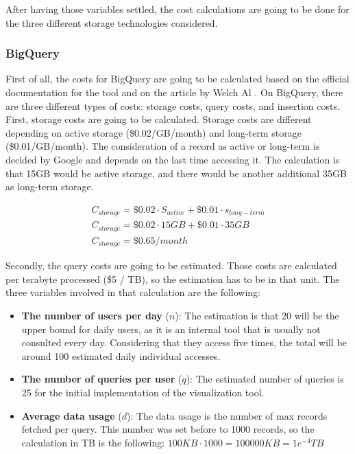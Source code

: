 \documentclass[english, 12pt, a4paper, sci, utf8, a-1b, online]{aaltothesis}
\begin{document}
After having those variables settled, the cost calculations are going to be done for the three different storage technologies considered.

\subsubsection*{BigQuery}

First of all, the costs for BigQuery are going to be calculated based on the official documentation for the tool \cite{BigQueryDocsPricing} and on the article by Welch Al \cite{BigQueryCosts}. On BigQuery, there are three different types of costs: storage costs, query costs, and insertion costs.\\

First, storage costs are going to be calculated. Storage costs are different depending on active storage (\$0.02/GB/month) and long-term storage (\$0.01/GB/month). The consideration of a record as active or long-term is decided by Google and depends on the last time accessing it. The calculation is that 15GB would be active storage, and there would be another additional 35GB as long-term storage.

\begin{equation}
\begin{split}
    C_{storage} = \$0.02 \cdot S_{active} + \$0.01 \cdot s_{long-term} \\
    C_{storage} = \$0.02 \cdot 15GB + \$0.01 \cdot 35GB \\
    C_{storage} = \$ 0.65 / month
\end{split}
\end{equation}

Secondly, the query costs are going to be estimated. Those costs are calculated per terabyte processed (\$5 / TB), so the estimation has to be in that unit. The three variables involved in that calculation are the following:

\begin{itemize}
    \item \textbf{The number of users per day} ($n$): The estimation is that 20 will be the upper bound for daily users, as it is an internal tool that is usually not consulted every day. Considering that they access five times, the total will be around 100 estimated daily individual accesses.
    \item \textbf{The number of queries per user} ($q$): The estimated number of queries is 25 for the initial implementation of the visualization tool.
    \item \textbf{Average data usage} ($d$): The data usage is the number of max records fetched per query. This number was set before to 1000 records, so the calculation in TB is the following: $100KB \cdot 1000 = 100000KB = 1e^{-4}TB$
    
\end{itemize}
\end{document}

